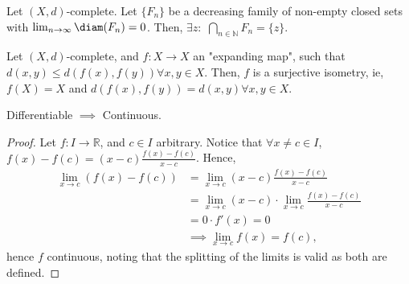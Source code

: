 \begin{theorem}
    Let $(X,d)$-complete. Let $\{F_n\}$ be a decreasing family of non-empty closed sets with $\lim_{n \to \infty} \diam(F_n) = 0$. Then, $\exists z:$ $\bigcap_{n \in \mathbb{N}} F_n = \{z\}$.
\end{theorem}

\begin{theorem}
    Let $(X, d)$-complete, and $f : X \to X$ an "expanding map", such that $d(x, y) \leq d(f(x), f(y)) \forall x, y \in X$. Then, $f$ is a surjective isometry, ie, $f(X) = X$ and $d(f(x), f(y)) = d(x, y) \forall x, y \in X$.
\end{theorem}

\begin{lemma}
    Differentiable $\implies$ Continuous.
\end{lemma}

\begin{proof}
    Let $f: I \to \mathbb{R}$, and $c \in I$ arbitrary. Notice that $\forall x \neq c \in I$, $f(x) - f(c) = (x-c) \frac{f(x)-f(c)}{x-c}$. Hence, \begin{align*}
        \lim_{ x \to c} (f(x) - f(c)) &= \lim_{ x \to c}(x-c) \frac{f(x)-f(c)}{x-c}\\
        &= \lim_{x \to c} (x- c) \cdot \lim_{x \to c} \frac{f(x) - f(c)}{x-c}\\
        &= 0 \cdot f'(x) = 0\\
        &\implies \lim_{x \to c} f(x) = f(c),
    \end{align*}
    hence $f$ continuous, noting that the splitting of the limits is valid as both are defined.
\end{proof}

